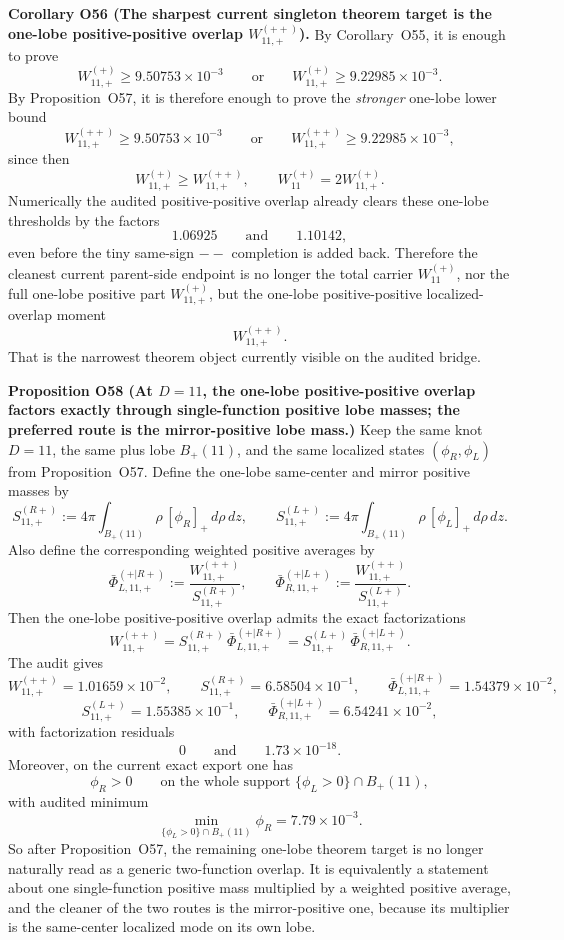 \documentclass[aps,prd,onecolumn,notitlepage,nofootinbib,superscriptaddress,11pt,floatfix]{revtex4-2}
\begin{document}
\medskip\noindent\textbf{Corollary O56 (The sharpest current singleton theorem target is the one-lobe positive-positive overlap \(W_{11,+}^{(++)}\)).}
By Corollary~O55, it is enough to prove
\[
W_{11,+}^{(+)}\ge 9.50753\times10^{-3}
\qquad\text{or}\qquad
W_{11,+}^{(+)}\ge 9.22985\times10^{-3}.
\]
By Proposition~O57, it is therefore enough to prove the \emph{stronger} one-lobe lower bound
\[
W_{11,+}^{(++)}\ge 9.50753\times10^{-3}
\qquad\text{or}\qquad
W_{11,+}^{(++)}\ge 9.22985\times10^{-3},
\]
since then
\[
W_{11,+}^{(+)}\ge W_{11,+}^{(++)},
\qquad
W_{11}^{(+)} = 2W_{11,+}^{(+)}.
\]
Numerically the audited positive-positive overlap already clears these one-lobe thresholds by the factors
\[
1.06925
\qquad\text{and}\qquad
1.10142,
\]
even before the tiny same-sign \(--\) completion is added back.  Therefore the cleanest current parent-side endpoint is no longer the total carrier \(W_{11}^{(+)}\), nor the full one-lobe positive part \(W_{11,+}^{(+)}\), but the one-lobe positive-positive localized-overlap moment
\[
W_{11,+}^{(++)}.
\]
That is the narrowest theorem object currently visible on the audited bridge.

\medskip\noindent\textbf{Proposition O58 (At \(D=11\), the one-lobe positive-positive overlap factors exactly through single-function positive lobe masses; the preferred route is the mirror-positive lobe mass.)}
Keep the same knot \(D=11\), the same plus lobe \(B_+(11)\), and the same localized states \((\phi_R,\phi_L)\) from Proposition~O57.  Define the one-lobe same-center and mirror positive masses by
\[
S_{11,+}^{(R+)}
:=
4\pi \int_{B_+(11)} \rho\,[\phi_R]_+\,d\rho\,dz,
\qquad
S_{11,+}^{(L+)}
:=
4\pi \int_{B_+(11)} \rho\,[\phi_L]_+\,d\rho\,dz.
\]
Also define the corresponding weighted positive averages by
\[
\bar\Phi_{L,11,+}^{(+|R+)}
:=
\frac{W_{11,+}^{(++)}}{S_{11,+}^{(R+)}},
\qquad
\bar\Phi_{R,11,+}^{(+|L+)}
:=
\frac{W_{11,+}^{(++)}}{S_{11,+}^{(L+)}}.
\]
Then the one-lobe positive-positive overlap admits the exact factorizations
\[
W_{11,+}^{(++)}
=
S_{11,+}^{(R+)}\,\bar\Phi_{L,11,+}^{(+|R+)}
=
S_{11,+}^{(L+)}\,\bar\Phi_{R,11,+}^{(+|L+)}.
\]
The audit
gives
\[
W_{11,+}^{(++)}=1.01659\times10^{-2},
\qquad
S_{11,+}^{(R+)}=6.58504\times10^{-1},
\qquad
\bar\Phi_{L,11,+}^{(+|R+)}=1.54379\times10^{-2},
\]
\[
S_{11,+}^{(L+)}=1.55385\times10^{-1},
\qquad
\bar\Phi_{R,11,+}^{(+|L+)}=6.54241\times10^{-2},
\]
with factorization residuals
\[
0
\qquad\text{and}\qquad
1.73\times10^{-18}.
\]
Moreover, on the current exact export one has
\[
\phi_R>0
\qquad\text{on the whole support }\{\phi_L>0\}\cap B_+(11),
\]
with audited minimum
\[
\min_{\{\phi_L>0\}\cap B_+(11)} \phi_R = 7.79\times10^{-3}.
\]
So after Proposition~O57, the remaining one-lobe theorem target is no longer naturally read as a generic two-function overlap.  It is equivalently a statement about one single-function positive mass multiplied by a weighted positive average, and the cleaner of the two routes is the mirror-positive one, because its multiplier is the same-center localized mode on its own lobe.
\end{document}
